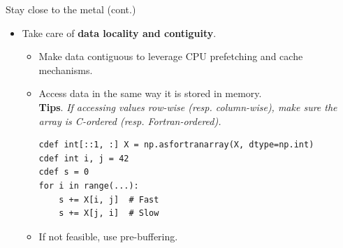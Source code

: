 \documentclass{beamer}
\begin{document}
\begin{frame}[fragile]{Stay close to the metal (cont.)}
\begin{itemize}
\item Take care of {\bf data locality and contiguity}.
  \begin{itemize}
    \item Make data contiguous to leverage CPU prefetching and cache mechanisms.
    \item Access data in the same way it is stored in memory.\\
    {\bf Tips}. \textit{If accessing values row-wise (resp. column-wise), make sure the array is C-ordered (resp. Fortran-ordered).}
\begin{verbatim}
cdef int[::1, :] X = np.asfortranarray(X, dtype=np.int)
cdef int i, j = 42
cdef s = 0
for i in range(...):
    s += X[i, j]  # Fast
    s += X[j, i]  # Slow
\end{verbatim}
    \item If not feasible, use pre-buffering.
  \end{itemize}
\end{itemize}
\end{frame}
\end{document}
